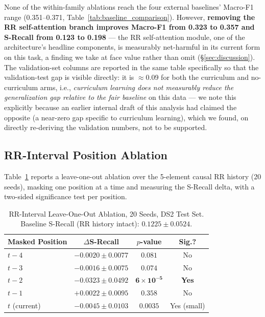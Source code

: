 \documentclass[journal,twoside,web]{ieeecolor}
\begin{document}
\noindent None of the within-family ablations reach the four external baselines' Macro-F1 range (0.351--0.371, Table~\ref{tab:baseline_comparison}). However, \textbf{removing the RR self-attention branch improves Macro-F1 from 0.323 to 0.357 and S-Recall from 0.123 to 0.198} --- the RR self-attention module, one of the architecture's headline components, is measurably net-harmful in its current form on this task, a finding we take at face value rather than omit (\S\ref{sec:discussion}). The validation-set columns are reported in the same table specifically so that the validation-test gap is visible directly: it is $\approx$0.09 for both the curriculum and no-curriculum arms, i.e., \emph{curriculum learning does not measurably reduce the generalization gap relative to the fair baseline} on this data --- we note this explicitly because an earlier internal draft of this analysis had claimed the opposite (a near-zero gap specific to curriculum learning), which we found, on directly re-deriving the validation numbers, not to be supported.

\subsection{RR-Interval Position Ablation}
\label{sec:results_rr}
Table~\ref{tab:rr_ablation} reports a leave-one-out ablation over the 5-element causal RR history (20 seeds), masking one position at a time and measuring the S-Recall delta, with a two-sided significance test per position.

\begin{table}[!t]
\centering
\caption{RR-Interval Leave-One-Out Ablation, 20 Seeds, DS2 Test Set. Baseline S-Recall (RR history intact): $0.1225\pm0.0524$.}
\label{tab:rr_ablation}
\begin{tabular}{l c c c}
\toprule
\textbf{Masked Position} & \textbf{$\Delta$S-Recall} & \textbf{$p$-value} & \textbf{Sig.?} \\ \midrule
$t-4$ & $-0.0020\pm0.0077$ & $0.081$ & No \\
$t-3$ & $-0.0016\pm0.0075$ & $0.074$ & No \\
\textbf{$t-2$} & $\mathbf{-0.0323\pm0.0492}$ & $\mathbf{6\times10^{-5}}$ & \textbf{Yes} \\
$t-1$ & $+0.0022\pm0.0095$ & $0.358$ & No \\
$t$ (current) & $-0.0045\pm0.0103$ & $0.0035$ & Yes (small) \\ \bottomrule
\end{tabular}
\end{table}
\end{document}
